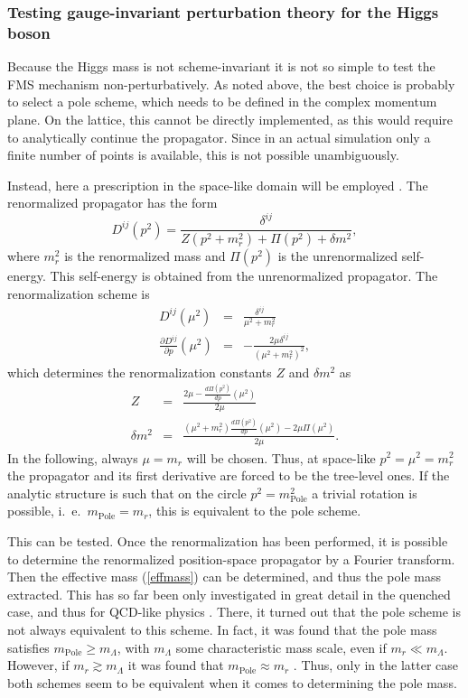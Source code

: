 \documentclass[final,12pt]{article}
\newcommand*{\no}{\noindent}
\newcommand*{\bea}{\begin{eqnarray}}
\newcommand*{\eea}{\end{eqnarray}}
\newcommand*{\be}{\begin{equation}}
\newcommand*{\ee}{\end{equation}}
\newcommand*{\pd}{\partial}
\newcommand*{\pref}[1]{(\ref{#1})}
\newcommand*{\nn}{\nonumber}
\newcommand*{\1}{1\!\!\!\bot}
\begin{document}
\subsubsection{Testing gauge-invariant perturbation theory for the Higgs boson}\label{sss:higgs}

Because the Higgs mass is not scheme-invariant \cite{Bohm:2001yx} it is not so simple to test the FMS mechanism non-perturbatively. As noted above, the best choice is probably to select a pole scheme, which needs to be defined in the complex momentum plane. On the lattice, this cannot be directly implemented, as this would require to analytically continue the propagator. Since in an actual simulation only a finite number of points is available, this is not possible unambiguously. 

Instead, here a prescription in the space-like domain will be employed \cite{Maas:2010nc,Maas:2016edk}. The renormalized propagator has the form \cite{Bohm:2001yx}
\be
D^{ij}(p^2)=\frac{\delta^{ij}}{Z(p^2+m_r^2)+\Pi(p^2)+\delta m^2}\nn,
\ee
\no where $m_r^2$ is the renormalized mass and $\Pi(p^2)$ is the unrenormalized self-energy. This self-energy is obtained from the unrenormalized propagator. The renormalization scheme is
\bea
D^{ij}(\mu^2)&=&\frac{\delta^{ij}}{\mu^2+m_r^2}\label{prc}\\
\frac{\pd D^{ij}}{\pd p}(\mu^2)&=&-\frac{2\mu\delta^{ij}}{(\mu^2+m_r^2)^2}\label{dprc},
\eea
\no which determines the renormalization constants $Z$ and $\delta m^2$ as
\bea
Z&=&\frac{2\mu-\frac{d\Pi(p^2)}{dp}(\mu^2)}{2\mu}\nn\\
\delta m^2&=&\frac{(\mu^2+m_r^2)\frac{d\Pi(p^2)}{dp}(\mu^2)-2\mu\Pi(\mu^2)}{2\mu}\nn.
\eea
\no In the following, always $\mu=m_r$ will be chosen. Thus, at space-like $p^2=\mu^2=m_r^2$ the propagator and its first derivative are forced to be the tree-level ones. If the analytic structure is such that on the circle $p^2=m_{\text{Pole}}^2$ a trivial rotation is possible, i.\ e.\ $m_\text{Pole}=m_r$, this is equivalent to the pole scheme.

This can be tested. Once the renormalization has been performed, it is possible to determine the renormalized position-space propagator by a Fourier transform. Then the effective mass \pref{effmass} can be determined, and thus the pole mass extracted. This has so far been only investigated in great detail in the quenched case, and thus for QCD-like physics \cite{Maas:2016edk}. There, it turned out that the pole scheme is not always equivalent to this scheme. In fact, it was found that the pole mass satisfies $m_{\text{Pole}}\ge m_\Lambda$, with $m_\Lambda$ some characteristic mass scale, even if $m_r\ll m_{\Lambda}$. However, if $m_r\gtrsim m_\Lambda$ it was found that $m_{\text{Pole}}\approx m_r$ \cite{Maas:2016edk}. Thus, only in the latter case both schemes seem to be equivalent when it comes to determining the pole mass.
\end{document}
